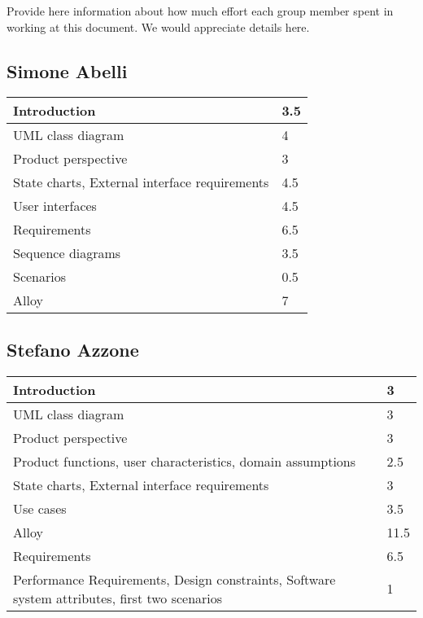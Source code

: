 Provide here information about how much effort each group member spent in working at this document. We would appreciate details here.\\

\subsection{Simone Abelli}
\begin{tabular} { | m{5cm} | m{1cm} | }
	\hline
	Introduction & 3.5\\
	\hline
	UML class diagram & 4\\
	\hline
	Product perspective & 3\\
	\hline
	State charts, External interface requirements & 4.5\\
	\hline
	User interfaces & 4.5\\
	\hline
	Requirements & 6.5\\
	\hline
	Sequence diagrams & 3.5\\
	\hline
	Scenarios & 0.5\\
	\hline
	Alloy & 7\\
	\hline
\end{tabular}

\subsection{Stefano Azzone}
\begin{tabular} { | m{5cm} | m{1cm} | }
	\hline
	Introduction & 3\\
	\hline
	UML class diagram & 3\\
	\hline
	Product perspective & 3\\
	\hline
	Product functions, user characteristics, domain assumptions & 2.5\\
	\hline
	State charts, External interface requirements & 3\\
	\hline
	Use cases & 3.5\\
	\hline
	Alloy & 11.5\\
	\hline
	Requirements & 6.5\\
	\hline
	Performance Requirements, Design constraints, Software system attributes, first two scenarios & 1\\
	\hline
\end{tabular}